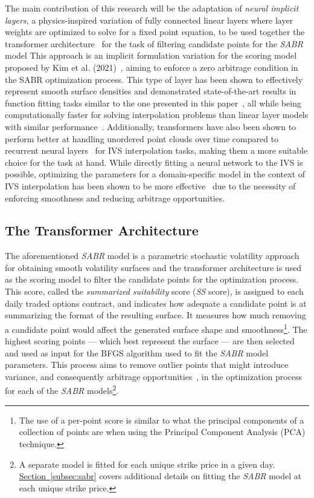 The main contribution of this research will be the adaptation of \textit{neural implicit layers},
a physics-inspired variation of fully connected linear layers where layer weights are optimized to solve for a fixed point equation,
to be used together the transformer architecture~\cite{Vaswani2017} for the task of filtering candidate points for the \textit{SABR} model
This approach is an implicit formulation variation for the scoring model proposed by Kim et al. (2021)~\cite{Kim2021},
aiming to enforce a zero arbitrage condition in the SABR optimization process.
This type of layer has been shown to effectively represent smooth surface densities and demonstrated state-of-the-art results in function
fitting tasks similar to the one presented in this paper~\cite{Kawaguchi2021},
all while being computationally faster for solving interpolation problems than linear layer models with similar performance~\cite{Kolter2020}.
Additionally, transformers have also been shown to perform better at handling unordered point clouds over time compared to recurrent neural layers~\cite{Kim2024}
for IVS interpolation tasks, making them a more suitable choice for the task at hand.
While directly fitting a neural network to the IVS is possible,
optimizing the parameters for a domain-specific model in the context of IVS interpolation has been shown to be more effective~\cite{Almeida2023}
due to the necessity of enforcing smoothness and reducing arbitrage opportunities.

\subsection{The Transformer Architecture}
\label{subsec:transformer}
The aforementioned \textit{SABR} model is a parametric stochastic volatility approach for obtaining smooth volatility surfaces and
the transformer architecture is used as the scoring model to filter the candidate points for the optimization process.
This score, called the \textit{summarized suitability} score (\textit{SS} score), is assigned to each daily traded options contract,
and indicates how adequate a candidate point is at summarizing the format of the resulting surface.
It measures how much removing a candidate point would affect the generated surface shape and
smoothness\footnote{The use of a per-point score is similar to what the principal components of a collection of points are when using the Principal Component Analysis (PCA) technique.}.
The highest scoring points --- which best represent the surface --- are then selected and used as input for the BFGS algorithm used to fit the \textit{SABR} model parameters.
This process aims to remove outlier points that might introduce variance, and consequently arbitrage opportunities~\cite{Kim2021},
in the optimization process for each of the \textit{SABR} models\footnote{
    A separate model is fitted for each unique strike price in a given day.
    \hyperref[subsec:sabr]{Section~\ref*{subsec:sabr}} covers additional details on fitting the \textit{SABR} model at each unique strike price.
}.

